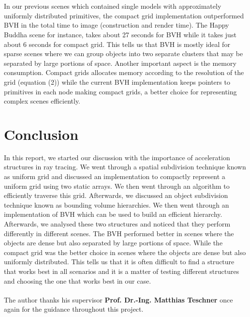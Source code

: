 \documentclass[11pt,a4paper]{article}
\begin{document}
\\~\\
In our previous scenes which contained single models with approximately uniformly distributed primitives, the compact grid implementation outperformed BVH in the total time to image (construction and render time). The Happy Buddha scene for instance, takes about 27 seconds for BVH while it takes just about 6 seconds for compact grid. This tells us that BVH is mostly ideal for sparse scenes \cite{boulos2005notes} where we can group objects into two separate clusters that may be separated by large portions of space. Another important aspect is the memory consumption. Compact grids allocates memory according to the resolution of the grid (equation (2)) while the current BVH implementation keeps pointers to primitives in each node making compact grids, a better choice for representing complex scenes efficiently.

\section{Conclusion}
In this report, we started our discussion with the importance of acceleration structures in ray tracing. We went through a spatial subdivision technique known as uniform grid and discussed an implementation to compactly represent a uniform grid using two static arrays. We then went through an algorithm to efficiently traverse this grid. Afterwards, we discussed an object subdivision technique known as bounding volume hierarchies. We then went through an implementation of BVH which can be used to build an efficient hierarchy. Afterwards, we analysed these two structures and noticed that they perform differently in different scenes. The BVH performed better in scenes where the objects are dense but also separated by large portions of space. While the compact grid was the better choice in scenes where the objects are dense but also uniformly distributed. This tells us that it is often difficult to find a structure that works best in all scenarios and it is a matter of testing different structures and choosing the one that works best in our case.
\\~\\
\noindent
The author thanks his supervisor \textbf{Prof.
	Dr.-Ing. Matthias Teschner} once again for the guidance throughout this project.
 


\end{document}
